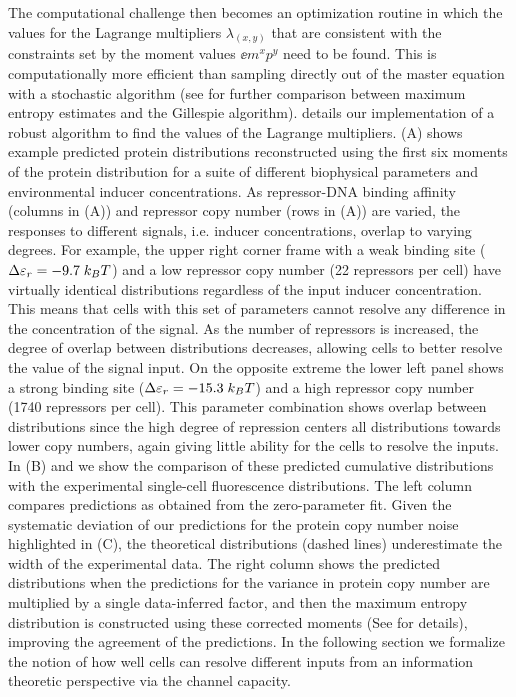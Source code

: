 The computational challenge then becomes an optimization routine in which the
values for the Lagrange multipliers $\lambda_{(x,y)}$ that are consistent with
the constraints set by the moment values $\ee{m^x p^y}$ need to be found. This
is computationally more efficient than sampling directly out of the master
equation with a stochastic algorithm (see  for further
comparison between maximum entropy estimates and the Gillespie algorithm).
 details our implementation of a robust algorithm to find
the values of the Lagrange multipliers. (A) shows example
predicted protein distributions reconstructed using the first six moments of
the protein distribution for a suite of different biophysical parameters and
environmental inducer concentrations. As repressor-DNA binding affinity
(columns in (A)) and repressor copy number (rows in
(A)) are varied, the responses to different signals, i.e.
inducer concentrations, overlap to varying degrees. For example, the upper
right corner frame with a weak binding site ($\Delta\varepsilon_r = -9.7 \; k_BT$) and a low
repressor copy number (22 repressors per cell) have virtually identical
distributions regardless of the input inducer concentration. This means that
cells with this set of parameters cannot resolve any difference in the
concentration of the signal. As the number of repressors is increased, the
degree of overlap between distributions decreases, allowing cells to better
resolve the value of the signal input. On the opposite extreme the lower left
panel shows a strong binding site ($\Delta\varepsilon_r = -15.3 \; k_BT$) and a high repressor
copy number (1740 repressors per cell). This parameter combination shows
overlap between distributions since the high degree of repression centers all
distributions towards lower copy numbers, again giving little ability for the
cells to resolve the inputs. In (B) and 
we show the comparison of these predicted cumulative distributions with the
experimental single-cell fluorescence distributions. The left column compares
predictions as obtained from the zero-parameter fit. Given the systematic
deviation of our predictions for the protein copy number noise highlighted in
(C), the theoretical distributions (dashed lines)
underestimate the width of the experimental data. The right column shows the
predicted distributions when the predictions for the variance in protein copy
number are multiplied by a single data-inferred factor, and then the maximum
entropy distribution is constructed using these corrected moments (See
 for details), improving the agreement of the
predictions. In the following section we formalize the notion of how well cells
can resolve different inputs from an information theoretic perspective via the
channel capacity.

